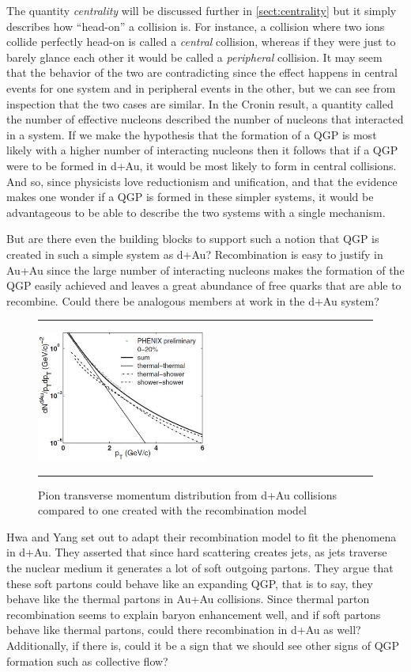 The quantity \textit{centrality} will be discussed further in \ref{sect:centrality} but it simply describes how ``head-on'' a collision is. For instance, a collision where two ions collide perfectly head-on is called a \textit{central} collision, whereas if they were just to barely glance each other it would be called a \textit{peripheral} collision. It may seem that the behavior of the two are contradicting since the effect happens in central events for one system and in peripheral events in the other, but we can see from inspection that the two cases are similar. In the Cronin result, a quantity called the number of effective nucleons described the number of nucleons that interacted in a system. If we make the hypothesis that the formation of a QGP is most likely with a higher number of interacting nucleons then it follows that if a QGP were to be formed in d+Au, it would be most likely to form in central collisions. And so, since physicists love reductionism and unification, and that the evidence makes one wonder if a QGP is formed in these simpler systems, it would be advantageous to be able to describe the two systems with a single mechanism.

But are there even the building blocks to support such a notion that QGP is created in such a simple system as d+Au? Recombination is easy to justify in Au+Au since the large number of interacting nucleons makes the formation of the QGP easily achieved and leaves a great abundance of free quarks that are able to recombine. Could there be analogous members at work in the d+Au system? 
\begin{figure}[b!]
  \centering
    \rule{35em}{0.5pt}
    \includegraphics[width=0.5\textwidth]{prevplots/daurecomb.JPG}

  \caption[Pion transverse momentum distribution from d+Au collisions compared to one created with the recombination model]{Pion transverse momentum distribution from d+Au collisions compared to one created with the recombination model}
  \label{fig:daaaratios}
    \rule{35em}{0.5pt}
\end{figure}
Hwa and Yang set out to adapt their recombination model to fit the phenomena in d+Au\citep{PhysRevLett.93.082302}. They asserted that since hard scattering creates jets, as jets traverse the nuclear medium it generates a lot of soft outgoing partons. They argue that these soft partons could behave like an expanding QGP, that is to say, they behave like the thermal partons in Au+Au collisions. Since thermal parton recombination seems to explain baryon enhancement well, and if soft partons behave like thermal partons, could there recombination in d+Au as well? Additionally, if there is, could it be a sign that we should see other signs of QGP formation such as collective flow? 

